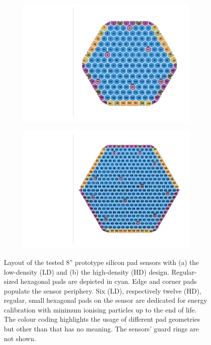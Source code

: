 \begin{figure}
	\captionsetup[subfigure]{aboveskip=-1pt,belowskip=-1pt}
	\centering
	\begin{subfigure}[b]{0.50\textwidth}
		\includegraphics[width=0.999\textwidth]{plots/ch_mapping/LD.pdf}
		\subcaption{
		}
	\end{subfigure}
	\hfill
	\begin{subfigure}[b]{0.48\textwidth}
		\includegraphics[width=0.999\textwidth]{plots/ch_mapping/HD.pdf}
		\subcaption{
		}
	\end{subfigure}    
	\caption{
        Layout of the tested 8'' prototype silicon pad sensors with (a) the low-density (LD) and (b) the high-density (HD) design.
		Regular-sized hexagonal pads are depicted in cyan.
		Edge and corner pads populate the sensor periphery. 
		Six (LD), respectively twelve (HD), regular, small hexagonal pads on the sensor are dedicated for energy calibration with minimum ionising particles up to the end of life.
		The colour coding highlights the usage of different pad geometries but other than that has no meaning.
		The sensors' guard rings are not shown.
	}
	\label{fig:Sensors}
\end{figure}
